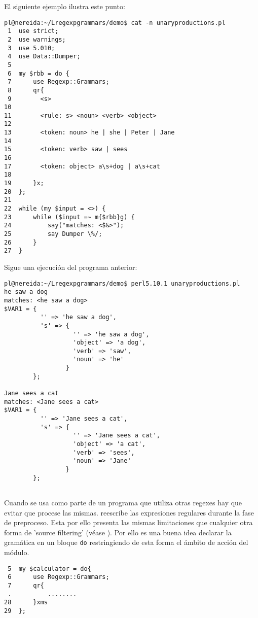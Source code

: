 El siguiente ejemplo ilustra este punto:
\begin{verbatim}
pl@nereida:~/Lregexpgrammars/demo$ cat -n unaryproductions.pl
 1  use strict;
 2  use warnings;
 3  use 5.010;
 4  use Data::Dumper;
 5
 6  my $rbb = do {
 7      use Regexp::Grammars;
 8      qr{
 9        <s>
10
11        <rule: s> <noun> <verb> <object>
12
13        <token: noun> he | she | Peter | Jane
14
15        <token: verb> saw | sees
16
17        <token: object> a\s+dog | a\s+cat
18
19      }x;
20  };
21
22  while (my $input = <>) {
23      while ($input =~ m{$rbb}g) {
24          say("matches: <$&>");
25          say Dumper \%/;
26      }
27  }
\end{verbatim}

Sigue una ejecución del programa anterior:

\begin{verbatim}
pl@nereida:~/Lregexpgrammars/demo$ perl5.10.1 unaryproductions.pl
he saw a dog
matches: <he saw a dog>
$VAR1 = {
          '' => 'he saw a dog',
          's' => {
                   '' => 'he saw a dog',
                   'object' => 'a dog',
                   'verb' => 'saw',
                   'noun' => 'he'
                 }
        };

Jane sees a cat
matches: <Jane sees a cat>
$VAR1 = {
          '' => 'Jane sees a cat',
          's' => {
                   '' => 'Jane sees a cat',
                   'object' => 'a cat',
                   'verb' => 'sees',
                   'noun' => 'Jane'
                 }
        };


\end{verbatim}


Cuando se usa  como parte de 
un programa que utiliza otras regexes hay que evitar 
que  procese las mismas. 
reescribe las expresiones regulares durante la fase de preproceso. Esta por ello 
presenta las mismas limitaciones que cualquier otra forma de 
'source filtering' (véase ). Por ello es una buena idea declarar
la gramática en un bloque \verb|do| restringiendo de esta forma el ámbito de 
acción del módulo.

\begin{verbatim}
 5  my $calculator = do{
 6      use Regexp::Grammars;
 7      qr{
 .          ........
28      }xms
29  };
\end{verbatim}

